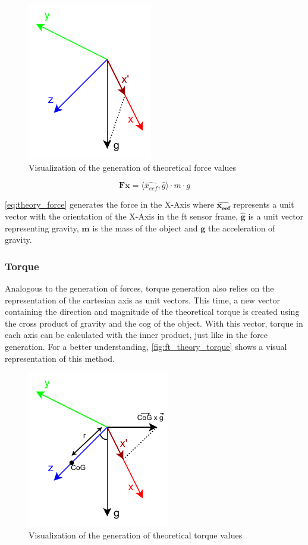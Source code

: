 \begin{figure}[h]
    \centering
    \includegraphics[width=0.3\linewidth]{figs/chp3/ft_theory_force.pdf}
    \caption{Visualization of the generation of theoretical force values}
    \label{fig:ft_theory_force}
\end{figure}

\begin{figure}[h]
    \begin{equation}
        \mathbf{Fx} = \langle \hat{x_{eef}} , \hat{g} \rangle \cdot m \cdot g
        \label{eq:theory_force}
    \end{equation}
\end{figure}

\par \autoref{eq:theory_force} generates the force in the X-Axis where $\mathbf{\hat{x_{eef}}}$ represents a unit vector with the orientation of the X-Axis in the \ac{ft} sensor frame, $\mathbf{\hat{g}}$ is a unit vector representing gravity, $\mathbf{m}$ is the mass of the object and $\mathbf{g}$ the acceleration of gravity.

\subsubsection{Torque}

\par Analogous to the generation of forces, torque generation also relies on the representation of the cartesian axis as unit vectors. This time, a new vector containing the direction and magnitude of the theoretical torque is created using the cross product of gravity and the \ac{cog} of the object. With this vector, torque in each axis can be calculated with the inner product, just like in the force generation. For a better understanding, \autoref{fig:ft_theory_torque} shows a visual representation of this method.

\begin{figure}[h]
    \centering
    \includegraphics[width=0.35\linewidth]{figs/chp3/ft_theory_torque.pdf}
    \caption{Visualization of the generation of theoretical torque values}
    \label{fig:ft_theory_torque}
\end{figure}

